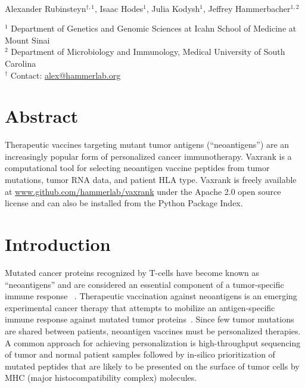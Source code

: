 \documentclass[10pt,letterpaper]{article}
\begin{document}
\vspace*{0.35in}

\begin{flushleft}
{\Large
\textbf{}
}
\newline
\\
Alexander Rubinsteyn$^{\dagger,1}$,
Isaac Hodes$^1$,
Julia Kodysh$^1$,
Jeffrey Hammerbacher$^{1,2}$
\\
\bigskip

	$^1$ Department of Genetics and Genomic Sciences at Icahn School of Medicine at Mount Sinai \\
    $^2$ Department of Microbiology and Immunology, Medical University of South Carolina \\
	$^\dagger$ Contact: \href{alex@hammerlab.org}{alex@hammerlab.org} \\


\end{flushleft}

\section*{Abstract}
	Therapeutic vaccines targeting mutant tumor antigens (``neoantigens'') are an increasingly popular form of personalized cancer immunotherapy. Vaxrank is a computational tool for selecting neoantigen vaccine peptides from tumor mutations, tumor RNA data, and patient HLA type.  Vaxrank is freely available at \href{https://www.github.com/hammerlab/vaxrank}{www.github.com/hammerlab/vaxrank} under the Apache  2.0 open source license and can also be installed from the Python Package Index.



\section{Introduction}


Mutated cancer proteins recognized by T-cells have become known as ``neoantigens'' and are considered an essential component of a tumor-specific immune response ~\citep{neoantigens-finnigan, neoantigens-schumacher, neoantigens-gubin}. Therapeutic vaccination against neoantigens is an emerging experimental cancer therapy that attempts to mobilize an antigen-specific immune response against mutated tumor proteins~\citep{neovax-sharma, neovax-sahin}. Since few tumor mutations are shared between patients, neoantigen vaccines must be personalized therapies. A common approach for achieving personalization is high-throughput sequencing of tumor and normal patient samples followed by in-silico prioritization of mutated peptides that are likely to be presented on the surface of tumor cells by MHC (major histocompatibility complex) molecules.
\end{document}
